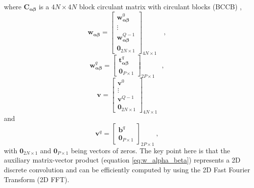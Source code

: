 \documentclass[manuscript]{geophysics}
\begin{document}
	where $\mathbf{C}_{\boldsymbol{\alpha\beta}}$ is a $4N \times 4N$ 
	block circulant matrix with circulant blocks (BCCB) \citep[e.g., ][ p. 184]{davis1979},
	\begin{equation}
		\mathbf{w}_{\boldsymbol{\alpha\beta}} = \begin{bmatrix}
			\mathbf{w}_{\boldsymbol{\alpha\beta}}^{0} \\
			\vdots \\
			\mathbf{w}_{\boldsymbol{\alpha\beta}}^{Q - 1} \\
			\mathbf{0}_{2N \times 1}
		\end{bmatrix}_{4N \times 1} \quad ,
		\label{eq:w_alpha_beta_partitioned}
	\end{equation}
	\begin{equation}
		\mathbf{w}_{\boldsymbol{\alpha\beta}}^{q} = \begin{bmatrix}
			\mathbf{t}^{q}_{\boldsymbol{\alpha\beta}} \\
			\mathbf{0}_{P \times 1}
		\end{bmatrix}_{2P \times 1}
		\label{eq:wq-vector} \quad ,
	\end{equation}
	\begin{equation}
		\mathbf{v} = \begin{bmatrix}
			\mathbf{v}^{0} \\
			\vdots \\
			\mathbf{v}^{Q - 1} \\
			\mathbf{0}_{2N \times 1}
		\end{bmatrix}_{4N \times 1}
		\label{eq:v-vector}
	\end{equation}
	and
	\begin{equation}
		\mathbf{v}^{q} = \begin{bmatrix}
			\mathbf{b}^{q} \\
			\mathbf{0}_{P \times 1}
		\end{bmatrix}_{2P \times 1} \: ,
		\label{eq:vq-vector} 
	\end{equation}
	with $\mathbf{0}_{2N \times 1}$ and $\mathbf{0}_{P \times 1}$ being vectors of zeros.
	The key point here is that the auxiliary matrix-vector product
	(equation \ref{eq:w_alpha_beta}) represents a 2D discrete convolution and can be 
	efficiently computed by using the 2D Fast Fourier Transform (2D FFT). 
	
\end{document}
